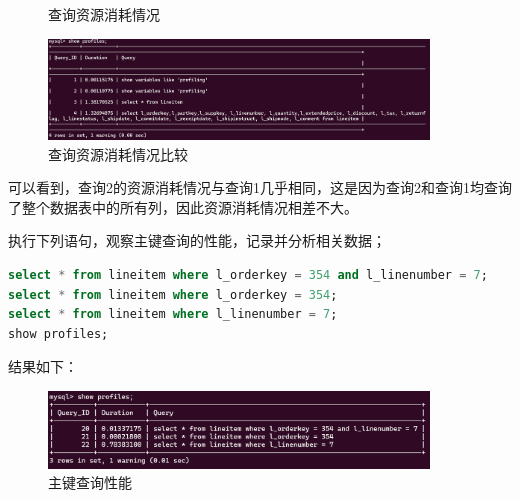 \documentclass{article}
\begin{document}
\begin{figure}[H]
  \centering
  \caption{查询资源消耗情况}
\end{figure}

\begin{figure}
\centering
\includegraphics[width=0.9\textwidth]{img/15.png}
\caption{查询资源消耗情况比较}
\end{figure}

可以看到，查询2的资源消耗情况与查询1几乎相同，这是因为查询2和查询1均查询了整个数据表中的所有列，因此资源消耗情况相差不大。

执行下列语句，观察主键查询的性能，记录并分析相关数据；

\begin{lstlisting}[language=sql]
select * from lineitem where l_orderkey = 354 and l_linenumber = 7;
select * from lineitem where l_orderkey = 354;
select * from lineitem where l_linenumber = 7;
show profiles;
\end{lstlisting}

结果如下：

\begin{figure}[H]
\centering
\includegraphics[width=0.9\textwidth]{img/16.png}
\caption{主键查询性能}
\end{figure}
\end{document}
